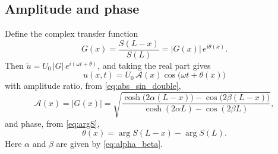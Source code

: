 \subsection{Amplitude and phase}

Define the complex transfer function
\begin{equation}
  G(x) = \frac{S(L-x)}{S(L)} = |G(x)|\,e^{i\theta(x)}.
\end{equation}
Then $\tilde u = U_0\,|G|\,e^{i(\omega t + \theta)}$, and taking the real part gives
\begin{equation}
  \boxed{\;u(x,t) = U_0\,\mathcal{A}(x)\cos\!\big(\omega t + \theta(x)\big)\;}
  \label{eq:u_real}
\end{equation}
with amplitude ratio, from \cref{eq:abs_sin_double},
\begin{equation}
  \mathcal{A}(x) = |G(x)| = \sqrt{\frac{\cosh\!\big(2\alpha(L-x)\big) - \cos\!\big(2\beta(L-x)\big)}
                                     {\cosh(2\alpha L) - \cos(2\beta L)}},
  \label{eq:amplitude}
\end{equation}
and phase, from \cref{eq:argS},
\begin{equation}
  \theta(x) = \arg S(L-x) - \arg S(L).
  \label{eq:phase}
\end{equation}
Here $\alpha$ and $\beta$ are given by \cref{eq:alpha_beta}.
